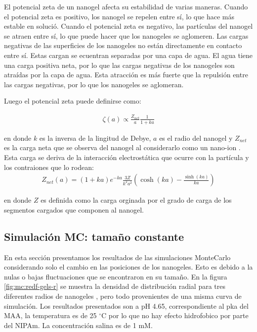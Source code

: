El potencial zeta de un nanogel afecta su estabilidad de varias maneras. Cuando el potencial zeta es positivo, los nanogel se repelen entre s\'i, lo que hace m\'as estable en soluci\'o. Cuando el potencial zeta es negativo, las part\'iculas del nanogel se atraen entre s\'i, lo que puede hacer que los nanogeles se aglomeren.
Las cargas negativas de las superficies de los nanogeles no est\'an directamente en contacto entre s\'i. Estas cargan se ecuentran  separadas por una capa de agua. El agua tiene una carga positiva neta, por lo que las cargas negativas de los nanogeles son atra\'idas por la capa de agua. Esta atracci\'on es m\'as fuerte que la repulsi\'on entre las cargas negativas, por lo que los nanogeles se aglomeran.

Luego el potencial zeta puede definirse como: \addcite[libro S\&C]

\begin{align}
	\zeta (a) \propto \frac{Z_{net}}{a} \frac{1}{1 +ka}
	\label{eq:mc:potzeta}
\end{align}


\noindent en donde  $k$ es la inversa de la lingitud de Debye, $a$ es el radio del nanogel y $Z_{net}$ es la carga neta que se observa del nanogel al considerarlo como un nano-ion \addcite[Denton 2003]. Esta carga se deriva de la interacci\'on electrost\'atica que ocurre con la part\'icula y los contraiones que lo rodean:
\begin{align}
	Z_{net}(a) = (1 + ka)e^{-ka} \frac{3Z}{k^2a^2}\left(\cosh(ka) - \frac{\sinh(ka)}{ka}\right)
	\label{eq:mc:znet}
\end{align}

\noindent en donde $Z$ es definida como la carga orginada por el grado de carga de los segmentos cargados que componen al nanogel.



\subsection{Simulaci\'on MC: tama\~no constante}

En esta secci\'on presentamos los resultados de las simulaciones MonteCarlo considerando solo el cambio en las posiciones de los nanogeles. Esto es debido a la nulas o bajas fluctuaciones que se encontraron en su tama\~no.
En la figura \ref{fig:mc:redf-gels-r} se muestra la densidad de  distribuci\'on radial para tres diferentes radios de nanogeles , pero todo provenientes de una misma curva de simulaci\'on. Los resultados presentados son a pH 4.65, correspondiente al pka del MAA, la temperatura es de 25 $^\circ$C por lo que no hay efecto hidrofobico por parte del NIPAm. La concentraci\'on salina es de 1 mM.

